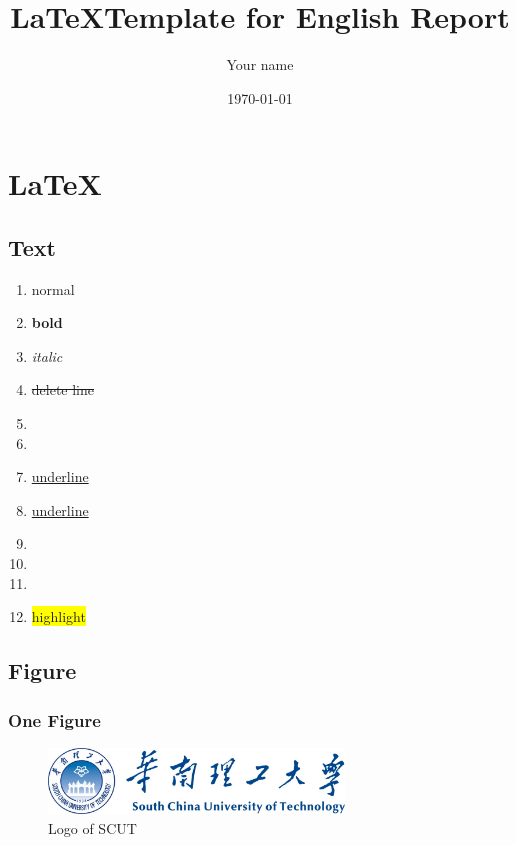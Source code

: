 \documentclass[
    UTF8
]{report}
\title{\LaTeX Template for English Report}
\author{Your name}
\date{\today}
\begin{document}
\pagestyle{plain}
\setcounter{page}{1}
\maketitle
{
    \hypersetup{linkcolor=black}
    \tableofcontents
    \newpage
}
\setcounter{page}{1}
\pagestyle{headings}

\chapter{\LaTeX}
\label{chapter:example}

\section{Text}

\begin{enumerate}
    \item normal
    \item \textbf{bold}
    \item \textit{italic}
    \item \sout{delete line}
    \item {}
    \item {}
    \item \underline{underline}
    \item \uline{underline}
    \item {}
    \item {}
    \item {}
    \item \colorbox{yellow}{highlight}
\end{enumerate}

\section{Figure}

\subsection{One Figure}

\begin{figure}[H]
    \centering
    \includegraphics[width=0.7\textwidth]{./img/logo.png}
    \caption{Logo of SCUT}
    \label{fig:logo}
\end{figure}
\end{document}
